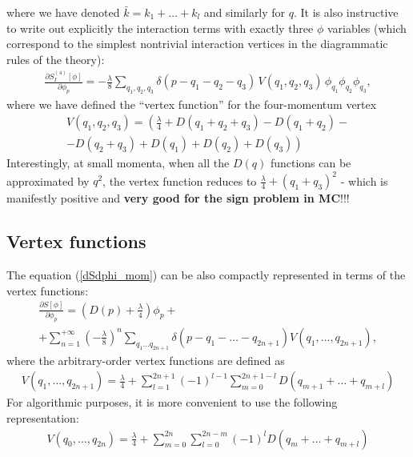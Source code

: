\documentclass[12pt]{article}
\newcommand{\lr}[1]{ \left( #1 \right) }
\newcommand{\lrs}[1]{ \left[ #1 \right] }
\begin{document}
where we have denoted $\bar{k} = k_1 + \ldots + k_l$ and similarly for $q$.
It is also instructive to write out explicitly the interaction terms with exactly three $\phi$ variables (which correspond to the simplest nontrivial interaction vertices in the diagrammatic rules of the theory):
\begin{eqnarray}
\label{dsdPhi_phi4}
 \frac{\partial S_I^{\lr{4}}\lrs{\phi}}{\partial \phi_p}
 =
 - \frac{\lambda}{8}
 \sum\limits_{q_1, q_2, q_3}
 \delta\lr{p - q_1 - q_2 - q_3} \,
 V\lr{q_1, q_2, q_3} \,
 \phi_{q_1} \phi_{q_2} \phi_{q_3} ,
\end{eqnarray}
where we have defined the ``vertex function'' for the four-momentum vertex
\begin{eqnarray}
\label{vertex_function4}
 V\lr{q_1, q_2, q_3} =
 \left(\frac{\lambda}{4} + D\lr{q_1 + q_2 + q_3} - D\lr{q_1 + q_2}
 - \right. \nonumber \\ \left. -
 D\lr{q_2 + q_3} + D\lr{q_1} + D\lr{q_2} + D\lr{q_3}\right)
\end{eqnarray}
Interestingly, at small momenta, when all the $D\lr{q}$ functions can be approximated by $q^2$, the vertex function reduces to $\frac{\lambda}{4} + \lr{q_1 + q_3}^2$ - which is manifestly positive and \textbf{very good for the sign problem in MC}!!!

\subsection{Vertex functions}
\label{subsec:vertex_func}

 The equation (\ref{dSdphi_mom}) can be also compactly represented in terms of the vertex functions:
\begin{eqnarray}
\label{dSdphi_mom_vertex}
 \frac{\partial S\lrs{\phi}}{\partial \phi_p}
 =
 \lr{D\lr{p} + \frac{\lambda}{4}} \phi_p
 + \nonumber \\ +
 \sum\limits_{n=1}^{+\infty} \lr{-\frac{\lambda}{8}}^{n}
 \sum\limits_{q_1 \ldots q_{2 n + 1}} \delta\lr{p - q_1 - \ldots - q_{2 n + 1}}
 V\lr{q_1, \ldots, q_{2 n + 1}} ,
\end{eqnarray}
where the arbitrary-order vertex functions are defined as
\begin{eqnarray}
\label{vertex_func_def}
 V\lr{q_1, \ldots, q_{2 n + 1}}
 =
 \frac{\lambda}{4} +
 \sum\limits_{l=1}^{2 n + 1} \lr{-1}^{l-1}
 \sum\limits_{m=0}^{2 n + 1 - l}
 D\lr{q_{m+1} + \ldots + q_{m+l}}
\end{eqnarray}
For algorithmic purposes, it is more convenient to use the following representation:
\begin{eqnarray}
\label{vertex_func_def_algorithmic}
 V\lr{q_0, \ldots, q_{2 n}}
 =
 \frac{\lambda}{4} +
 \sum\limits_{m=0}^{2 n}
 \sum\limits_{l=0}^{2 n - m}
 \lr{-1}^{l}
 D\lr{q_{m} + \ldots + q_{m+l}}
\end{eqnarray}
\end{document}
